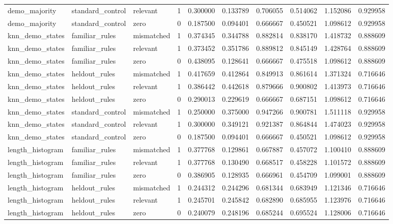 \begin{tabular}{llllllllll}
demo\_majority & standard\_control & relevant & 1 & 0.300000 & 0.133789 & 0.706055 & 0.514062 & 1.152086 & 0.929958 \\
demo\_majority & standard\_control & zero & 0 & 0.187500 & 0.094401 & 0.666667 & 0.450521 & 1.098612 & 0.929958 \\
knn\_demo\_states & familiar\_rules & mismatched & 1 & 0.374345 & 0.344788 & 0.882814 & 0.838170 & 1.418732 & 0.888609 \\
knn\_demo\_states & familiar\_rules & relevant & 1 & 0.373452 & 0.351786 & 0.889812 & 0.845149 & 1.428764 & 0.888609 \\
knn\_demo\_states & familiar\_rules & zero & 0 & 0.438095 & 0.128641 & 0.666667 & 0.475518 & 1.098612 & 0.888609 \\
knn\_demo\_states & heldout\_rules & mismatched & 1 & 0.417659 & 0.412864 & 0.849913 & 0.861614 & 1.371324 & 0.716646 \\
knn\_demo\_states & heldout\_rules & relevant & 1 & 0.386442 & 0.442618 & 0.879666 & 0.900802 & 1.413973 & 0.716646 \\
knn\_demo\_states & heldout\_rules & zero & 0 & 0.290013 & 0.229619 & 0.666667 & 0.687151 & 1.098612 & 0.716646 \\
knn\_demo\_states & standard\_control & mismatched & 1 & 0.250000 & 0.375000 & 0.947266 & 0.900781 & 1.511118 & 0.929958 \\
knn\_demo\_states & standard\_control & relevant & 1 & 0.300000 & 0.349121 & 0.921387 & 0.864844 & 1.474023 & 0.929958 \\
knn\_demo\_states & standard\_control & zero & 0 & 0.187500 & 0.094401 & 0.666667 & 0.450521 & 1.098612 & 0.929958 \\
length\_histogram & familiar\_rules & mismatched & 1 & 0.377768 & 0.129861 & 0.667887 & 0.457072 & 1.100410 & 0.888609 \\
length\_histogram & familiar\_rules & relevant & 1 & 0.377768 & 0.130490 & 0.668517 & 0.458228 & 1.101572 & 0.888609 \\
length\_histogram & familiar\_rules & zero & 0 & 0.386905 & 0.128935 & 0.666961 & 0.454709 & 1.099001 & 0.888609 \\
length\_histogram & heldout\_rules & mismatched & 1 & 0.244312 & 0.244296 & 0.681344 & 0.683949 & 1.121346 & 0.716646 \\
length\_histogram & heldout\_rules & relevant & 1 & 0.245701 & 0.245842 & 0.682890 & 0.685955 & 1.123976 & 0.716646 \\
length\_histogram & heldout\_rules & zero & 0 & 0.240079 & 0.248196 & 0.685244 & 0.695524 & 1.128006 & 0.716646 \\

\end{tabular}

